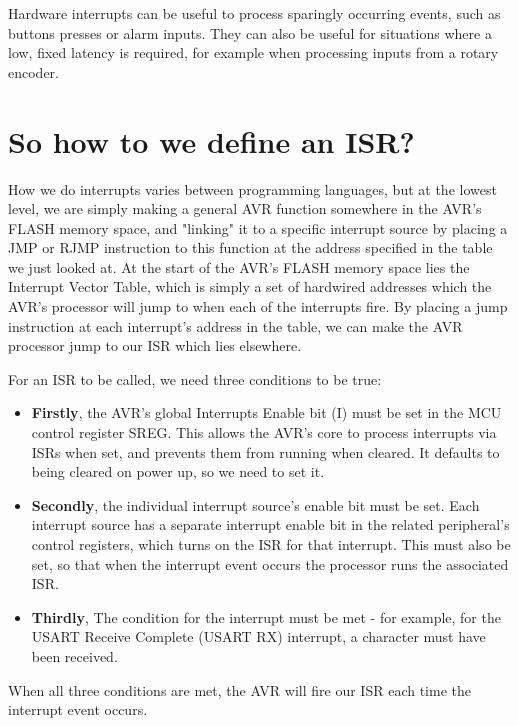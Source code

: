 \documentclass[a4paper,oneside]{book}
\begin{document}
Hardware interrupts can be useful to process sparingly occurring events, such as buttons presses or alarm inputs. They can also be useful for situations where a low, fixed latency is required, for example when processing inputs from a rotary encoder.


\label{chp:DefISR}
\chapter{So how to we define an ISR?}

How we do interrupts varies between programming languages, but at the lowest level, we are simply making a general AVR function somewhere in the AVR's FLASH memory space, and "linking" it to a specific interrupt source by placing a JMP or RJMP instruction to this function at the address specified in the table we just looked at. At the start of the AVR's FLASH memory space lies the Interrupt Vector Table, which is simply a set of hardwired addresses which the AVR's processor will jump to when each of the interrupts fire. By placing a jump instruction at each interrupt's address in the table, we can make the AVR processor jump to our ISR which lies elsewhere.

For an ISR to be called, we need three conditions to be true: 

\begin{itemize}
\item \textbf{Firstly}, the AVR's global Interrupts Enable bit (I) must be set in the MCU control register SREG. This allows the AVR's core to process interrupts via ISRs when set, and prevents them from running when cleared. It defaults to being cleared on power up, so we need to set it.

\item \textbf{Secondly}, the individual interrupt source's enable bit must be set. Each interrupt source has a separate interrupt enable bit in the related peripheral's control registers, which turns on the ISR for that interrupt. This must also be set, so that when the interrupt event occurs the processor runs the associated ISR.

\item \textbf{Thirdly}, The condition for the interrupt must be met - for example, for the USART Receive Complete (USART RX) interrupt, a character must have been received. 
\end{itemize}

When all three conditions are met, the AVR will fire our ISR each time the interrupt event occurs.
\end{document}
